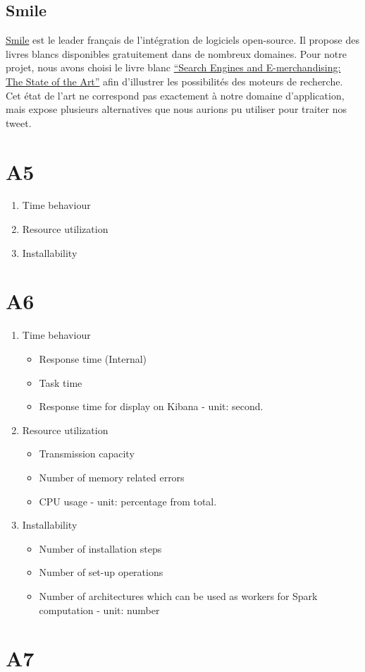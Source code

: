   \subsection{Smile}
    \href{http://www.smile.fr/}{Smile} est le leader français de l'intégration de logiciels open-source. Il propose des livres blancs disponibles gratuitement dans de nombreux domaines. Pour notre projet, nous avons choisi le livre blanc \href{http://www.smile.fr/Livres-blancs}{``Search Engines and E-merchandising: The State of the Art''} afin d'illustrer les possibilités des moteurs de recherche. Cet état de l'art ne correspond pas exactement à notre domaine d'application, mais expose plusieurs alternatives que nous aurions pu utiliser pour traiter nos tweet.

\section{A5}
  \begin{enumerate}
    \item Time behaviour
    \item Resource utilization
    \item Installability
  \end{enumerate}

\section{A6}
  \begin{enumerate}
    \item Time behaviour
      \begin{itemize}
        \item Response time (Internal)
        \item Task time
        \item Response time for display on Kibana - unit: second.
      \end{itemize} \bigskip

    \item Resource utilization
      \begin{itemize}
        \item Transmission capacity
        \item Number of memory related errors
        \item CPU usage - unit: percentage from total.
      \end{itemize} \bigskip

    \item Installability
      \begin{itemize}
        \item Number of installation steps
        \item Number of set-up operations
        \item Number of architectures which can be used as workers for Spark computation - unit: number
      \end{itemize} \bigskip
  \end{enumerate}

\section{A7}
